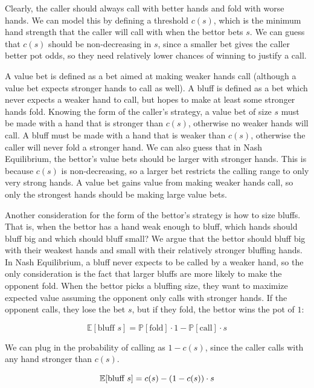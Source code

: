 \documentclass[a4paper,12pt]{article}
\theoremstyle{plain}
\theoremstyle{definition}
\begin{document}
Clearly, the caller should always call with better hands and fold with worse hands.  We can model this by defining a threshold $c(s)$, which is the minimum hand strength that the caller will call with when the bettor bets $s$. We can guess that $c(s)$ should be non-decreasing in $s$, since a smaller bet gives the caller better pot odds, so they need relatively lower chances of winning to justify a call.

A value bet is defined as a bet aimed at making weaker hands call (although a value bet expects stronger hands to call as well). A bluff is defined as a bet which never expects a weaker hand to call, but hopes to make at least some stronger hands fold. Knowing the form of the caller's strategy, a value bet of size $s$ must be made with a hand that is stronger than $c(s)$, otherwise no weaker hands will call. A bluff must be made with a hand that is weaker than $c(s)$, otherwise the caller will never fold a stronger hand. We can also guess that in Nash Equilibrium, the bettor's value bets should be larger with stronger hands. This is because $c(s)$ is non-decreasing, so a larger bet restricts the calling range to only very strong hands. A value bet gains value from making weaker hands call, so only the strongest hands should be making large value bets. 

Another consideration for the form of the bettor's strategy is how to size bluffs. That is, when the bettor has a hand weak enough to bluff, which hands should bluff big and which should bluff small? We argue that the bettor should bluff big with their weakest hands and small with their relatively stronger bluffing hands. In Nash Equilibrium, a bluff never expects to be called by a weaker hand, so the only consideration is the fact that larger bluffs are more likely to make the opponent fold. When the bettor picks a bluffing size, they want to maximize expected value assuming the opponent only calls with stronger hands. If the opponent calls, they lose the bet $s$, but if they fold, the bettor wins the pot of $1$:

\[ \mathbb{E}[\text{bluff } s] = \mathbb{P}[\text{fold}] \cdot 1 -\mathbb{P}[\text{call}] \cdot s \]

We can plug in the probability of calling as $1-c(s)$, since the caller calls with any hand stronger than $c(s)$.

\begin{equation}{\label{eq:bluff}}
    \mathbb{E}[\text{bluff } s] = c(s) - (1-c(s)) \cdot s
\end{equation}
\end{document}
